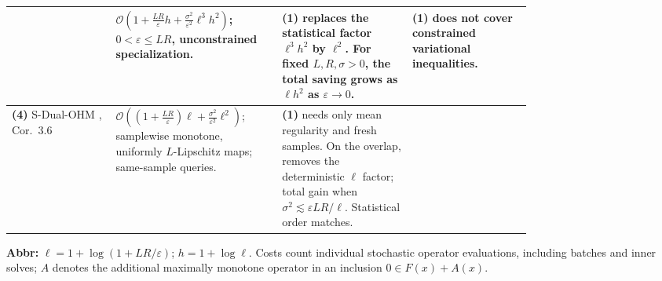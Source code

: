 \begin{table}[tp]
\begin{threeparttable}
\begin{tabularx}{\linewidth}{@{}>{\raggedright\arraybackslash}p{0.20\linewidth}>{\raggedright\arraybackslash}p{0.32\linewidth}>{\raggedright\arraybackslash}p{0.25\linewidth}>{\raggedright\arraybackslash}X@{}}
& $\mathcal{O}\!\left(1+\frac{LR}{\varepsilon}h+\frac{\sigma^2}{\varepsilon^2}\ell^3h^2\right)$; $0<\varepsilon\le LR$, unconstrained specialization.
& \textbf{(1)} replaces the statistical factor $\ell^3h^2$ by $\ell^2$. For fixed $L,R,\sigma>0$, the total saving grows as $\ell h^2$ as $\varepsilon\to0$.
& \textbf{(1)} does not cover constrained variational inequalities. \\
\midrule
\textbf{(4)} S-Dual-OHM \citep{slmYoonLoizou2026}, Cor.~3.6
& $\mathcal{O}\!\left((1+\frac{LR}{\varepsilon})\ell+\frac{\sigma^2}{\varepsilon^2}\ell^2\right)$; samplewise monotone, uniformly $L$-Lipschitz maps; same-sample queries.
& \textbf{(1)} needs only mean regularity and fresh samples. On the overlap, removes the deterministic $\ell$ factor; total gain when $\sigma^2\lesssim\varepsilon LR/\ell$. Statistical order matches.
& \\
\bottomrule
\end{tabularx}
\begin{tablenotes}[flushleft]\footnotesize
\item[] \textbf{Abbr:} $\ell=1+\log(1+LR/\varepsilon)$; $h=1+\log\ell$. Costs count individual stochastic operator evaluations, including batches and inner solves; $A$ denotes the additional maximally monotone operator in an inclusion $0\in F(x)+A(x)$.
\end{tablenotes}
\end{threeparttable}
\end{table}
\clearpage
